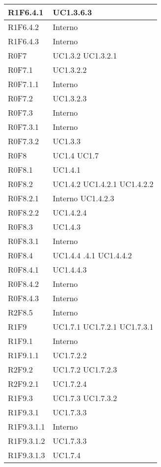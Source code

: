 \begin{center}
\begin{longtable}{| p{4cm} | p{4cm} |}
		\hline
		R1F6.4.1  &  UC1.3.6.3 \\
		\hline
		R1F6.4.2  &  Interno \\
		\hline
		R1F6.4.3  &  Interno \\
		\hline
		R0F7  &  UC1.3.2 \newline UC1.3.2.1 \\
		\hline
		R0F7.1  &  UC1.3.2.2 \\
		\hline
		R0F7.1.1  &  Interno \\
		\hline
		R0F7.2  &  UC1.3.2.3 \\
		\hline
		R0F7.3  &  Interno \\
		\hline
		R0F7.3.1  &  Interno \\
		\hline
		R0F7.3.2  &  UC1.3.3 \\
		\hline
		R0F8  &  UC1.4 \newline UC1.7 \\
		\hline
		R0F8.1  &  UC1.4.1 \\
		\hline
		R0F8.2  &  UC1.4.2 \newline UC1.4.2.1 \newline UC1.4.2.2 \\
		\hline
		R0F8.2.1  &  Interno \newline UC1.4.2.3 \\
		\hline
		R0F8.2.2  &  UC1.4.2.4 \\
		\hline
		R0F8.3  &  UC1.4.3 \\
		\hline
		R0F8.3.1  &  Interno \\
		\hline
		R0F8.4  &  UC1.4.4 \newline 1.4.4.1 \newline UC1.4.4.2 \\
		\hline
		R0F8.4.1  &  UC1.4.4.3 \\
		\hline
		R0F8.4.2  &  Interno \\
		\hline
		R0F8.4.3  &  Interno \\
		\hline
		R2F8.5	&	Interno\\
		\hline
		R1F9  &  UC1.7.1 \newline UC1.7.2.1 \newline UC1.7.3.1 \\
		\hline
		R1F9.1  &  Interno \\
		\hline
		R1F9.1.1  &  UC1.7.2.2 \\
		\hline
		R2F9.2  &  UC1.7.2 \newline UC1.7.2.3  \\
		\hline
		R2F9.2.1  &  UC1.7.2.4 \\
		\hline
		R1F9.3  & UC1.7.3  \newline UC1.7.3.2 \\
		\hline
		R1F9.3.1  &  UC1.7.3.3\\
		\hline
		R1F9.3.1.1  &  Interno \\
		\hline
		R1F9.3.1.2  &  UC1.7.3.3\\
		\hline
		R1F9.3.1.3  &  UC1.7.4\\
		\hline



\end{longtable}
\end{center}
